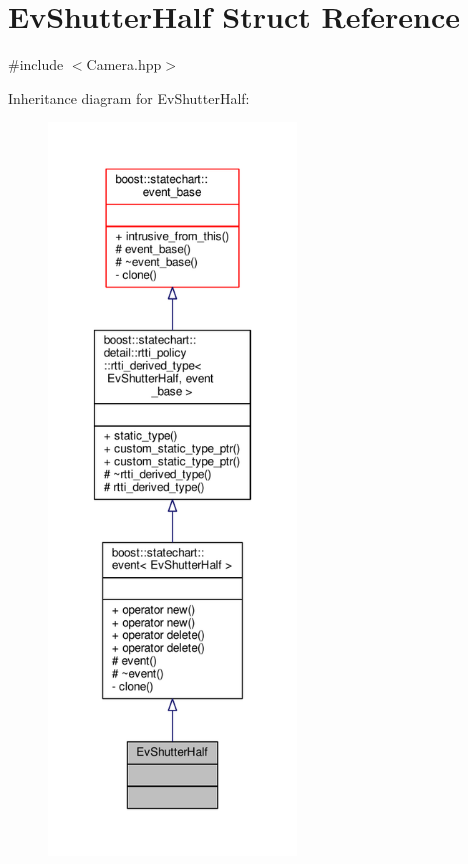 \hypertarget{struct_ev_shutter_half}{}\section{Ev\+Shutter\+Half Struct Reference}
\label{struct_ev_shutter_half}


{\ttfamily \#include $<$Camera.\+hpp$>$}



Inheritance diagram for Ev\+Shutter\+Half\+:
\nopagebreak
\begin{figure}[H]
\begin{center}
\leavevmode
\includegraphics[height=550pt]{struct_ev_shutter_half__inherit__graph}
\end{center}
\end{figure}


